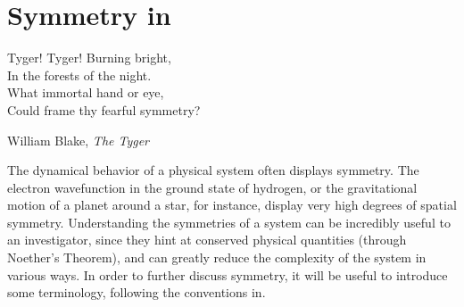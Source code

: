 \chapter{Symmetry in \pCf}	
\epigraph{Tyger! Tyger! Burning bright, \\
		In the forests of the night. \\
		What immortal hand or eye,\\
		Could frame thy fearful symmetry?}{William Blake, \emph{The Tyger}} 
The dynamical behavior of a physical system often displays symmetry. The electron wavefunction in the ground state of hydrogen, or the gravitational motion of a planet around a star, for instance, display very high degrees of spatial symmetry.  Understanding the symmetries of a system can be incredibly useful to an investigator, since they hint at conserved physical quantities (through Noether's Theorem), and can greatly reduce the complexity of the system in various ways. In order to further discuss symmetry, it will be useful to introduce some terminology, following the conventions in.  \\

